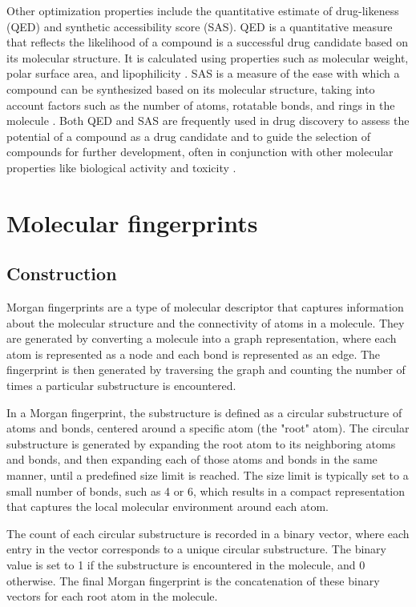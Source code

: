Other optimization properties include the quantitative estimate of drug-likeness (QED) and synthetic accessibility score (SAS). QED is a quantitative measure that reflects the likelihood of a compound is a successful drug candidate based on its molecular structure. It is calculated using properties such as molecular weight, polar surface area, and lipophilicity \cite{craig1998molecular}. SAS is a measure of the ease with which a compound can be synthesized based on its molecular structure, taking into account factors such as the number of atoms, rotatable bonds, and rings in the molecule \cite{ertl2009estimation}. Both QED and SAS are frequently used in drug discovery to assess the potential of a compound as a drug candidate and to guide the selection of compounds for further development, often in conjunction with other molecular properties like biological activity and toxicity \cite{lee2022mgcvae}.

\section{Molecular fingerprints}
\subsection{Construction}
Morgan fingerprints are a type of molecular descriptor that captures information about the molecular structure and the connectivity of atoms in a molecule. They are generated by converting a molecule into a graph representation, where each atom is represented as a node and each bond is represented as an edge. The fingerprint is then generated by traversing the graph and counting the number of times a particular substructure is encountered.

In a Morgan fingerprint, the substructure is defined as a circular substructure of atoms and bonds, centered around a specific atom (the "root" atom). The circular substructure is generated by expanding the root atom to its neighboring atoms and bonds, and then expanding each of those atoms and bonds in the same manner, until a predefined size limit is reached. The size limit is typically set to a small number of bonds, such as 4 or 6, which results in a compact representation that captures the local molecular environment around each atom.

The count of each circular substructure is recorded in a binary vector, where each entry in the vector corresponds to a unique circular substructure. The binary value is set to 1 if the substructure is encountered in the molecule, and 0 otherwise. The final Morgan fingerprint is the concatenation of these binary vectors for each root atom in the molecule.

